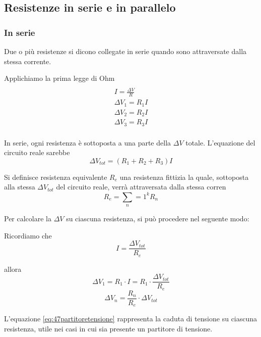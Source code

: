 \subsection{Resistenze in serie e in parallelo}
    \subsubsection{In serie}
        \par Due o più resistenze si dicono collegate in serie quando sono attraversate dalla stessa corrente.
        \par Applichiamo la prima legge di Ohm
        \begin{multline*}
            \\I=\frac{\Delta V}{R}\\\Delta V_1=R_1I\\
            \Delta V_2=R_2I\\
            \Delta V_3=R_3I\\
        \end{multline*}
        \par In serie, ogni resistenza è sottoposta a una parte della $\Delta V$ totale. L'equazione del circuito reale sarebbe
        \begin{equation*}
            \Delta V_{tot}=(R_1+R_2+R_3)I
        \end{equation*}
        \par Si definisce resistenza equivalente $R_e$ una resistenza fittizia la quale, sottoposta alla stessa $\Delta V_{tot}$ del circuito reale, verrà attraversata dalla stessa corren
        \begin{equation}
            R_e=\sum_n=1^k R_n
        \end{equation}
        \par Per calcolare la $\Delta V$ su ciascuna resistenza, si può procedere nel seguente modo:
        \par Ricordiamo che
        \begin{equation*}
            I=\frac{\Delta V_{tot}}{R_e}
        \end{equation*}
        \par allora
        \begin{equation*}
            \Delta V_1=R_1\cdot I=R_1\cdot\frac{\Delta V_{tot}}{R_e}
        \end{equation*}
        \begin{equation}\label{eq:47partitoretensione}
            \Delta V_n=\frac{R_n}{R_e}\cdot\Delta V_{tot}
        \end{equation}
        \par L'equazione \ref{eq:47partitoretensione} rappresenta la caduta di tensione su ciascuna resistenza, utile nei casi in cui sia presente un partitore di tensione.